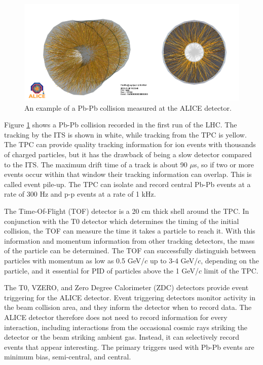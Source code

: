\begin{figure}[hbt]
\includegraphics[width=36pc]{Figures/BorrowedFigures/ExampleCollision.png}
\caption[Example of a Pb-Pb collision]{An example of a Pb-Pb collision measured at the ALICE detector.}
\label{fig:ExampleCollision}
\end{figure}
Figure \ref{fig:ExampleCollision} shows a Pb-Pb collision recorded in the first run of the LHC.
The tracking by the ITS is shown in white, while tracking from the TPC is yellow.
The TPC can provide quality tracking information for ion events with thousands of charged particles, but it has the drawback of being a slow detector compared to the ITS.
The maximum drift time of a track is about 90 $\mu$s, so if two or more events occur within that window their tracking information can overlap.
This is called event pile-up.
The TPC can isolate and record central Pb-Pb events at a rate of 300 Hz and p-p events at a rate of 1 kHz.

The Time-Of-Flight (TOF) detector is a 20 cm thick shell around the TPC.
In conjunction with the T0 detector which determines the timing of the initial collision, the TOF can measure the time it takes a particle to reach it.
With this information and momentum information from other tracking detectors, the mass of the particle can be determined.
The TOF can successfully distinguish between particles with momentum as low as 0.5 GeV/$c$ up to 3-4 GeV/$c$, depending on the particle, and it essential for PID of particles above the 1 GeV/$c$ limit of the TPC. 

The T0, VZERO, and Zero Degree Calorimeter (ZDC) detectors provide event triggering for the ALICE detector.
Event triggering detectors monitor activity in the beam collision area, and they inform the detector when to record data.
The ALICE detector therefore does not need to record information for every interaction, including interactions from the occasional cosmic rays striking the detector or the beam striking ambient gas.
Instead, it can selectively record events that appear interesting.
The primary triggers used with Pb-Pb events are minimum bias, semi-central, and central.

